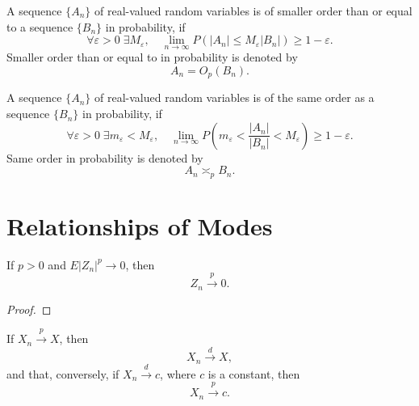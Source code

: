 \begin{definition}
	A sequence $\{A_n\}$ of real-valued random variables is of smaller order than or equal to a sequence $\{B_n\}$ in probability, if
	\begin{equation}
		\forall\varepsilon>0\;\exists M_\varepsilon,\quad\lim_{n\rightarrow\infty} P\left(|A_n|\leq M_\varepsilon|B_n|\right)\geq 1-\varepsilon.
	\end{equation}
	Smaller order than or equal to in probability is denoted by
	\begin{equation}
		A_n=O_p(B_n).
	\end{equation}
\end{definition}

\begin{definition}
	A sequence $\{A_n\}$ of real-valued random variables is of the same order as a sequence $\{B_n\}$ in probability, if
	\begin{equation}
		\forall\varepsilon>0\;\exists m_{\varepsilon}<M_{\varepsilon},\quad\lim_{n\rightarrow\infty} P\left(m_{\varepsilon}<\frac{|A_{n}|}{|B_{n}|}<M_{\varepsilon}\right)\geq 1-\varepsilon.
	\end{equation}
	Same order in probability is denoted by
	\begin{equation}
		A_{n}\asymp_{p}B_{n}.
	\end{equation}
\end{definition}

\section{Relationships of Modes}

\begin{lemma}
	If $p>0$ and $E\left|Z_{n}\right|^{p}\rightarrow 0$, then
	\begin{equation}
		Z_{n}\stackrel{p}{\rightarrow}0.
	\end{equation}
\end{lemma}

\begin{proof}

\end{proof}

\begin{theorem}
	If $X_{n}\stackrel{p}{\rightarrow}X$, then
	\begin{equation}
		X_{n}\stackrel{d}{\rightarrow}X,
	\end{equation}
	and that, conversely, if $X_{n}\stackrel{d}{\rightarrow}c$, where $c$ is a constant, then
	\begin{equation}
		X_{n}\stackrel{p}{\rightarrow}c.
	\end{equation}
\end{theorem}


